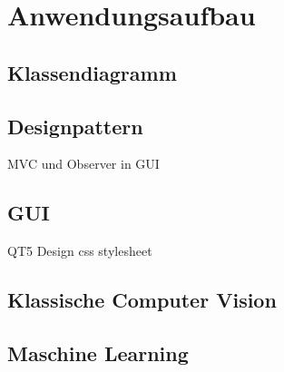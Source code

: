 \chapter{Anwendungsaufbau}
\label{ch:anwendungsaufbau}

\section{Klassendiagramm}
\section{Designpattern}
MVC und Observer in GUI
\section{GUI}
QT5
Design css stylesheet
\section{Klassische Computer Vision}
\section{Maschine Learning}


